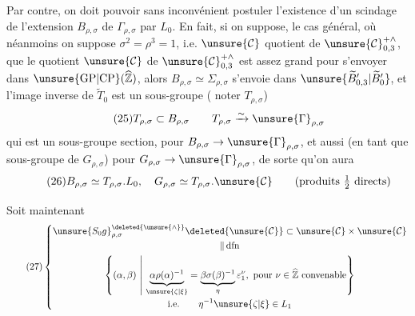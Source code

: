 Par contre, on doit pouvoir sans inconvénient postuler l'existence d'un scindage  de l'extension $B_{\rho,\sigma}$ de $\Gamma_{\rho,\sigma}$ par $L_0$.
En fait, si on suppose,  
 le cas général, où néanmoins on suppose $\sigma^2=\rho^3=1$, i.e. $\unsure{\mathcal{C}}$ quotient de $\unsure{\mathcal{C}}_{0,3}^{+\wedge}$, que le quotient $\unsure{\mathcal{C}}$ de $\unsure{\mathcal{C}}_{0,3}^{+\wedge}$ est assez grand pour s'envoyer dans $\unsure{\mathrm{GP}|\mathrm{CP}}(\widehat{\mathbb{Z}})$, alors  $B_{\rho,\sigma}\simeq\Sigma_{\rho,\sigma}$ s'envoie dans $\unsure{\widetilde{B}'_{0,3}|\widetilde{B}'_{0}}$, et l'image inverse de $\widetilde{T}_0$ est un sous-groupe ( noter $T_{\rho,\sigma}$)
\[
\tag{25}
T_{\rho,\sigma}\subset B_{\rho,\sigma}\qquad
T_{\rho,\sigma}\xrightarrow{\sim}\unsure{\Gamma}_{\rho,\sigma}
\]
qui est un sous-groupe section, pour $B_{\rho,\sigma}\to\unsure{\Gamma}_{\rho,\sigma}$, et aussi (en tant que sous-groupe de $G_{\rho,\sigma}$) pour $G_{\rho,\sigma}\to\unsure{\Gamma}_{\rho,\sigma}$, de sorte qu'on aura
\[
\tag{26}
B_{\rho,\sigma}\simeq T_{\rho,\sigma}.L_0,\quad
G_{\rho,\sigma}\simeq T_{\rho,\sigma}.\unsure{\mathcal{C}}
\qquad\text{(produits $\tfrac12$ directs)}
\]


Soit maintenant
\[
\tag{27}
\left\{
\begin{gathered}
\unsure{S_0g}_{\rho,\sigma}^{\deleted{\unsure{\wedge}}}
\deleted{\unsure{\mathcal{C}}}\subset
\unsure{\mathcal{C}}\times\unsure{\mathcal{C}}
\\[-0.3ex]
\Vert\,\mathrm{dfn}
\\
\left\{(\alpha,\beta)\ \middle|\
\underbrace{\alpha\rho(\alpha)^{-1}}_{\unsure{\zeta|\xi}}
=\underbrace{\beta\sigma(\beta)^{-1}}_{\eta}\varepsilon_1^\nu,
\ \text{pour }\nu\in\widehat{\mathbb{Z}}\ \text{convenable}\right\}
\\[-0.3ex]
\text{i.e.}\qquad \eta^{-1}\unsure{\zeta|\xi}\in L_1
\end{gathered}
\right.
\]

